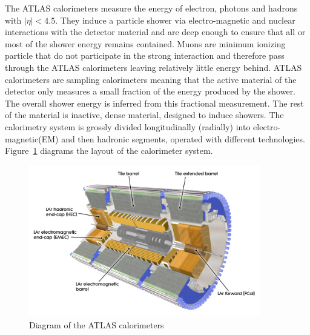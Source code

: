 The ATLAS calorimeters measure the energy of electron, photons and hadrons with $|\eta|<4.5$. They induce a particle shower via electro-magnetic and nuclear interactions with the detector material and are deep enough to ensure that all or most of the shower energy remains contained. Muons are minimum ionizing particle that do not participate in the strong interaction and therefore pass through the ATLAS calorimeters leaving relatively little energy behind. ATLAS calorimeters are sampling calorimeters meaning that the active material of the detector only measures a small fraction of the energy produced by the shower. The overall shower energy is inferred from this fractional measurement. The rest of the material is inactive, dense material, designed to induce showers. The calorimetry system is grossly divided longitudinally (radially) into electro-magnetic(EM) and then hadronic segments, operated with different technologies. Figure~\ref{figure:lhc_calo} diagrams the layout of the calorimeter system.

\begin{figure}[!t]
\centering 
\includegraphics[width=0.9\textwidth]{figs/lhc/Calorimeter-eps-converted-to}
\caption{Diagram of the ATLAS calorimeters}
\label{figure:lhc_calo}
\end{figure}


